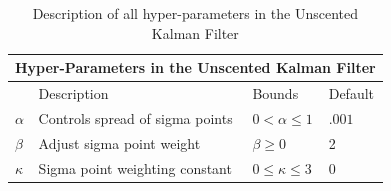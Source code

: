 \begin{center}
\begin{table}[h]
\centering
\caption{Description of all hyper-parameters in the Unscented Kalman Filter} \label{tab:sometab}
\begin{tabular}{ |p{1cm}||p{5cm}|p{2cm}| p{1cm}| }
    \hline
    \multicolumn{4}{|c|}{Hyper-Parameters in the Unscented Kalman Filter } \\ 
    \hline
     & Description & Bounds & Default \\
    \hline
    $\alpha$ & Controls spread of sigma points & $0 < \alpha \leq 1$ & $.001$\\
    $\beta$ & Adjust sigma point weight & $\beta \geq 0$ & 2\\
    $\kappa $ & Sigma point weighting constant & $0 \leq \kappa \leq 3 $  & 0 \\
    \hline
\end{tabular}
\end{table}
\label{tab:hyperparam}
\end{center}
            
            
            
            
            
            
    
  